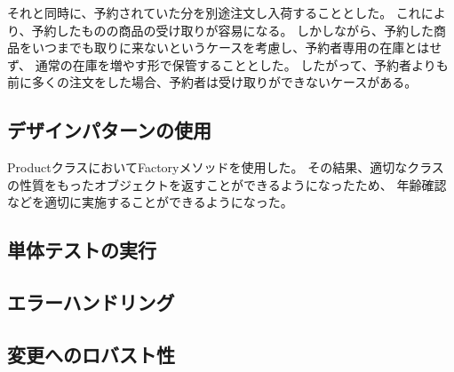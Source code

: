 \documentclass[a4paper,11pt]{jsarticle}
\begin{document}
それと同時に、予約されていた分を別途注文し入荷することとした。
これにより、予約したものの商品の受け取りが容易になる。
しかしながら、予約した商品をいつまでも取りに来ないというケースを考慮し、予約者専用の在庫とはせず、
通常の在庫を増やす形で保管することとした。
したがって、予約者よりも前に多くの注文をした場合、予約者は受け取りができないケースがある。


\subsection{デザインパターンの使用}

ProductクラスにおいてFactoryメソッドを使用した。
その結果、適切なクラスの性質をもったオブジェクトを返すことができるようになったため、
年齢確認などを適切に実施することができるようになった。

\subsection{単体テストの実行}
\subsection{エラーハンドリング}
\subsection{変更へのロバスト性}
\end{document}
